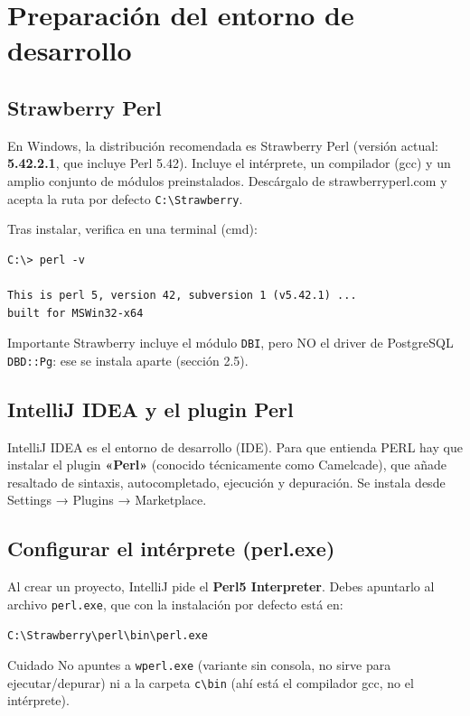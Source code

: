 \documentclass[11pt]{article}
\begin{document}
\section{Preparación del entorno de desarrollo}
\subsection{Strawberry Perl}
En Windows, la distribución recomendada es Strawberry Perl (versión actual: \textbf{5.42.2.1}, que incluye Perl 5.42). Incluye el intérprete, un compilador (gcc) y un amplio conjunto de módulos preinstalados. Descárgalo de strawberryperl.com y acepta la ruta por defecto \texttt{C:\textbackslash{}Strawberry}.

Tras instalar, verifica en una terminal (cmd):

\begin{cajacodigo}[Terminal]
\begin{lstlisting}[style=markup]
C:\> perl -v

This is perl 5, version 42, subversion 1 (v5.42.1) ...
built for MSWin32-x64
\end{lstlisting}
\end{cajacodigo}
\vspace{2pt}
\begin{cajatip}{Importante}
Strawberry incluye el módulo \texttt{DBI}, pero NO el driver de PostgreSQL \texttt{DBD::Pg}: ese se instala aparte (sección 2.5).\par
\end{cajatip}
\subsection{IntelliJ IDEA y el plugin Perl}
IntelliJ IDEA es el entorno de desarrollo (IDE). Para que entienda PERL hay que instalar el plugin \textbf{«Perl»} (conocido técnicamente como Camelcade), que añade resaltado de sintaxis, autocompletado, ejecución y depuración. Se instala desde Settings → Plugins → Marketplace.

\subsection{Configurar el intérprete (perl.exe)}
Al crear un proyecto, IntelliJ pide el \textbf{Perl5 Interpreter}. Debes apuntarlo al archivo \texttt{perl.exe}, que con la instalación por defecto está en:

\begin{cajacodigo}
\begin{lstlisting}[style=markup]
C:\Strawberry\perl\bin\perl.exe
\end{lstlisting}
\end{cajacodigo}
\vspace{2pt}
\begin{cajawarn}{Cuidado}
No apuntes a \texttt{wperl.exe} (variante sin consola, no sirve para ejecutar/depurar) ni a la carpeta \texttt{c\textbackslash{}bin} (ahí está el compilador gcc, no el intérprete).\par
\end{cajawarn}
\end{document}
